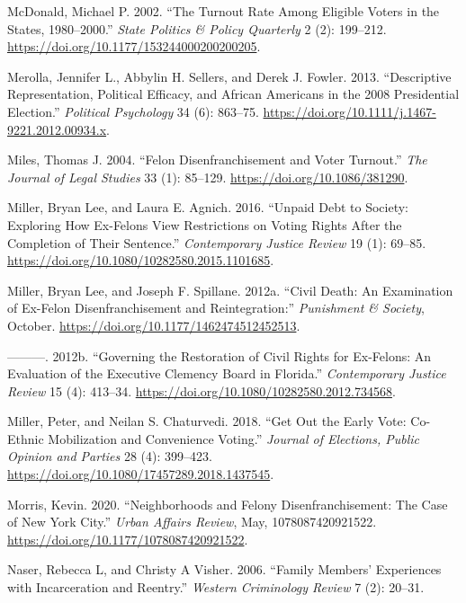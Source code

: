 \documentclass[
  12pt,
]{article}
\newlength{\cslhangindent}
\newenvironment{cslreferences}%
  {\setlength{\parindent}{0pt}%
  \everypar{\setlength{\hangindent}{\cslhangindent}}\ignorespaces}%
  {\par}
\begin{document}
\begin{cslreferences}
\leavevmode\hypertarget{ref-McDonald2002}{}%
McDonald, Michael P. 2002. ``The Turnout Rate Among Eligible Voters in the States, 1980--2000.'' \emph{State Politics \& Policy Quarterly} 2 (2): 199--212. \url{https://doi.org/10.1177/153244000200200205}.

\leavevmode\hypertarget{ref-Merolla2013}{}%
Merolla, Jennifer L., Abbylin H. Sellers, and Derek J. Fowler. 2013. ``Descriptive Representation, Political Efficacy, and African Americans in the 2008 Presidential Election.'' \emph{Political Psychology} 34 (6): 863--75. \url{https://doi.org/10.1111/j.1467-9221.2012.00934.x}.

\leavevmode\hypertarget{ref-Miles2004}{}%
Miles, Thomas J. 2004. ``Felon Disenfranchisement and Voter Turnout.'' \emph{The Journal of Legal Studies} 33 (1): 85--129. \url{https://doi.org/10.1086/381290}.

\leavevmode\hypertarget{ref-Miller2016}{}%
Miller, Bryan Lee, and Laura E. Agnich. 2016. ``Unpaid Debt to Society: Exploring How Ex-Felons View Restrictions on Voting Rights After the Completion of Their Sentence.'' \emph{Contemporary Justice Review} 19 (1): 69--85. \url{https://doi.org/10.1080/10282580.2015.1101685}.

\leavevmode\hypertarget{ref-Miller2012}{}%
Miller, Bryan Lee, and Joseph F. Spillane. 2012a. ``Civil Death: An Examination of Ex-Felon Disenfranchisement and Reintegration:'' \emph{Punishment \& Society}, October. \url{https://doi.org/10.1177/1462474512452513}.

\leavevmode\hypertarget{ref-Miller2012a}{}%
---------. 2012b. ``Governing the Restoration of Civil Rights for Ex-Felons: An Evaluation of the Executive Clemency Board in Florida.'' \emph{Contemporary Justice Review} 15 (4): 413--34. \url{https://doi.org/10.1080/10282580.2012.734568}.

\leavevmode\hypertarget{ref-Miller2018}{}%
Miller, Peter, and Neilan S. Chaturvedi. 2018. ``Get Out the Early Vote: Co-Ethnic Mobilization and Convenience Voting.'' \emph{Journal of Elections, Public Opinion and Parties} 28 (4): 399--423. \url{https://doi.org/10.1080/17457289.2018.1437545}.

\leavevmode\hypertarget{ref-Morris2020}{}%
Morris, Kevin. 2020. ``Neighborhoods and Felony Disenfranchisement: The Case of New York City.'' \emph{Urban Affairs Review}, May, 1078087420921522. \url{https://doi.org/10.1177/1078087420921522}.

\leavevmode\hypertarget{ref-Naser2006}{}%
Naser, Rebecca L, and Christy A Visher. 2006. ``Family Members' Experiences with Incarceration and Reentry.'' \emph{Western Criminology Review} 7 (2): 20--31.


\end{cslreferences}
\end{document}
